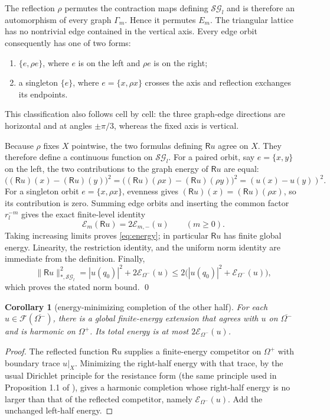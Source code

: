 \documentclass[11pt]{article}
\newtheorem{corollary}[theorem]{Corollary}
\newcommand{\SG}{\mathcal{SG}}
\newcommand{\E}{\mathcal E}
\newcommand{\F}{\mathcal F}
\newcommand{\R}{\mathsf R}
\begin{document}
The reflection $\rho$ permutes the contraction maps defining $\SG_l$ and is
therefore an automorphism of every graph $\Gamma_m$.  Hence it permutes
$E_m$.  The triangular lattice has no nontrivial edge contained in the
vertical axis.  Every edge orbit consequently has one of two forms:
\begin{enumerate}
\item $\{e,\rho e\}$, where $e$ is on the left and $\rho e$ is on the right;
\item a singleton $\{e\}$, where $e=\{x,\rho x\}$ crosses the axis and
      reflection exchanges its endpoints.
\end{enumerate}
This classification also follows cell by cell: the three graph-edge directions
are horizontal and at angles $\pm\pi/3$, whereas the fixed axis is vertical.

Because $\rho$ fixes $X$ pointwise, the two formulas defining $\R u$ agree on
$X$.  They therefore define a continuous function on $\SG_l$.  For a paired
orbit, say $e=\{x,y\}$ on the left, the two contributions to the graph energy
of $\R u$ are equal:
\[
 \bigl((\R u)(x)-(\R u)(y)\bigr)^2
 =\bigl((\R u)(\rho x)-(\R u)(\rho y)\bigr)^2
 =(u(x)-u(y))^2.
\]
For a singleton orbit $e=\{x,\rho x\}$, evenness gives
$(\R u)(x)=(\R u)(\rho x)$, so its contribution is zero.  Summing edge
orbits and inserting the common factor $r_l^{-m}$ gives the exact finite-level
identity
\[
  \E_m(\R u)=2\E_{m,-}(u)
  \qquad(m\geq0).
\]
Taking increasing limits proves \eqref{eq:energy}; in particular $\R u$ has
finite global energy.  Linearity, the restriction identity, and the uniform
norm identity are immediate from the definition.  Finally,
\[
 \|\R u\|_{*,\SG_l}^2
 =|u(q_0)|^2+2\E_{\Omega^-}(u)
 \leq2\bigl(|u(q_0)|^2+\E_{\Omega^-}(u)\bigr),
\]
which proves the stated norm bound. \qed

\begin{corollary}[energy-minimizing completion of the other half]
For each $u\in\F(\overline{\Omega^-})$, there is a global finite-energy
extension that agrees with $u$ on $\overline{\Omega^-}$ and is harmonic on
$\Omega^+$.  Its total energy is at most $2\E_{\Omega^-}(u)$.
\end{corollary}

\begin{proof}
The reflected function $\R u$ supplies a finite-energy competitor on
$\Omega^+$ with boundary trace $u|_X$.  Minimizing the right-half energy with
that trace, by the usual Dirichlet principle for the resistance form (the same
principle used in Proposition 1.1 of \cite{CQ}), gives a harmonic completion
whose right-half energy is no larger than that of the reflected competitor,
namely $\E_{\Omega^-}(u)$.  Add the unchanged left-half energy.
\end{proof}
\end{document}
